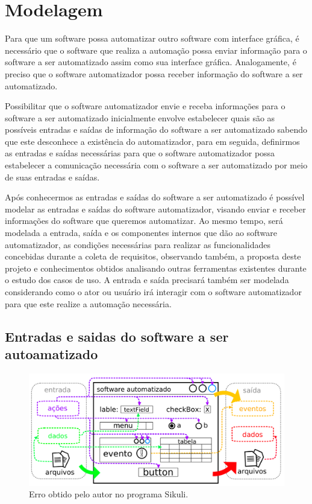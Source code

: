 \documentclass[tg]{mdtufsm}
\begin{document}
        \section {Modelagem}

            Para que um software possa automatizar outro software com interface gráfica, é necessário que o software que realiza a automação possa enviar informação para o software a ser automatizado assim como sua interface gráfica. Analogamente, é preciso que o software automatizador possa receber informação do software a ser automatizado.

            Possibilitar que o software automatizador envie e receba informações para o software a ser automatizado inicialmente envolve estabelecer quais são as possíveis entradas e saídas de informação do software a ser automatizado sabendo que este desconhece a existência do automatizador, para em seguida, definirmos as entradas e saídas necessárias para que o software automatizador possa estabelecer a comunicação necessária com o software a ser automatizado por meio de suas entradas e saídas.

            Após conhecermos as entradas e saídas do software a ser automatizado é possível modelar as entradas e saídas do software automatizador, visando enviar e receber informações do software que queremos automatizar. Ao mesmo tempo, será modelada a entrada, saída e os componentes internos que dão ao software automatizador, as condições necessárias para realizar as funcionalidades concebidas durante a coleta de requisitos, observando também, a proposta deste projeto e conhecimentos obtidos analisando outras ferramentas existentes durante o estudo dos casos de uso. A entrada e saída precisará também ser modelada considerando como o ator ou usuário irá interagir com o software automatizador para que este realize a automação necessária.

            \subsection{Entradas e saidas do software a ser autoamatizado}

                \begin{figure}[!htb]
                    {\centering
                    \includegraphics[width=1.0\textwidth]{imagens/modelIO}
                    \caption{Erro obtido pelo autor no programa Sikuli.}
                    \label{fig:modelIO}}
                \end{figure}
\end{document}
